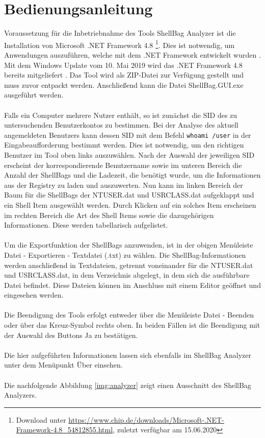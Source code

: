 \section{Bedienungsanleitung}
\vspace{0.5cm}
Voraussetzung für die Inbetriebnahme des Tools \glqq ShellBag Analyzer\grqq{} ist die Installation von Microsoft .NET Framework 4.8 \footnote{Download unter \url{https://www.chip.de/downloads/Microsoft-.NET-Framework-4.8_54812855.html}, zuletzt verfügbar am 15.06.2020}. Dies ist notwendig, um Anwendungen auszuführen, welche mit dem .NET Framework entwickelt wurden \cite{nett}. Mit dem Windows Update vom 10. Mai 2019 wird das .NET Framework 4.8 bereits mitgeliefert \cite{update}. Das Tool wird als ZIP-Datei zur Verfügung gestellt und muss zuvor entpackt werden. Anschließend kann die Datei \glqq ShellBag.GUI.exe\grqq{} ausgeführt werden. \\
\\
Falls ein Computer mehrere Nutzer enthält, so ist zunächst die SID des zu untersuchenden Benutzerkontos zu bestimmen. Bei der Analyse des aktuell angemeldeten Benutzers kann dessen SID mit dem Befehl \glqq \texttt{whoami /user}\grqq{} in der Eingabeaufforderung bestimmt werden. Dies ist notwendig, um den richtigen Benutzer im Tool oben links auszuwählen. Nach der Auswahl der jeweiligen SID erscheint der korrespondierende Benutzername sowie im unteren Bereich die Anzahl der ShellBags und die Ladezeit, die benötigt wurde, um die Informationen aus der Registry zu laden und auszuwerten. Nun kann im linken Bereich der Baum für die ShellBags der NTUSER.dat und  USRCLASS.dat aufgeklappt und ein Shell Item ausgewählt werden. Durch Klicken auf ein solches Item erscheinen im rechten Bereich die Art des Shell Items sowie die dazugehörigen Informationen. Diese werden tabellarisch aufgelistet. \\
\\
Um die Exportfunktion der ShellBags anzuwenden, ist in der obigen Menüleiste \glqq Datei - Exportieren - Textdatei (.txt)\grqq{} zu wählen. Die ShellBag-Informationen werden anschließend in Textdateien, getrennt voneinander für die NTUSER.dat und USRCLASS.dat, in dem Verzeichnis abgelegt, in dem sich die ausführbare Datei befindet. Diese Dateien können im Anschluss mit einem Editor geöffnet und eingesehen werden. \\
\\
Die Beendigung des Tools erfolgt entweder über die Menüleiste \glqq Datei - Beenden\grqq{} oder über das Kreuz-Symbol rechts oben. In beiden Fällen ist die Beendigung mit der Auswahl des Buttons \glqq Ja\grqq{} zu bestätigen. \\
\\
Die hier aufgeführten Informationen lassen sich ebenfalls im \glqq ShellBag Analyzer\grqq{} unter dem Menüpunkt \glqq Über\grqq{} einsehen. \\
\\
Die nachfolgende Abbildung \ref{img:analyzer} zeigt einen Ausschnitt des \glqq ShellBag Analyzers\grqq{}.

